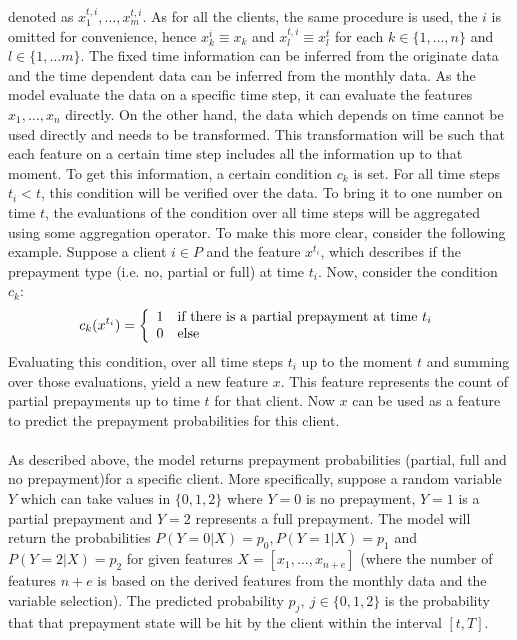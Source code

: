     denoted as  $x_1^{t, i}, \ldots, x_m^{t, i}$. As for all the clients, 
    the same procedure 
    is used, the $i$ is omitted for convenience, hence 
    $x_k^i \equiv x_k$ and $x_l^{t, i} \equiv x_l^t$ for each 
    $k \in \{1, \ldots, n\}$ and $l \in \{1, 
    \ldots m \}$.  The fixed time information can be inferred
    from the originate data and the time dependent data can be 
    inferred from the monthly data. As the model evaluate the data on 
    a specific time step, it can evaluate the features 
    $x_1, \ldots, x_n$ directly. On the other hand, the data
    which depends on time cannot be used directly and needs to be 
    transformed. This transformation will be such that each feature 
    on a certain time step includes all the information up to that 
    moment. To get this information, a certain condition $c_k$ is set. 
    For all time steps $t_i < t$, this condition will be verified 
    over the data. To bring it to one number on time $t$, the 
    evaluations of the condition over all time steps will be aggregated 
    using some aggregation operator. To make this more clear, consider 
    the following example. Suppose a client $i \in P$ and the feature 
    $x^{t_i}$, which describes if the prepayment type (i.e. no, partial or 
    full) at time $t_i$. Now, consider the condition $c_k$:
    \begin{equation}
        c_k(x^{t_i}) = \left\{
        \begin{array}{l l l l l}
            1 & \text{if there is a partial prepayment at time } t_i \\ 
            0 & \text{else}
        \end{array}
        \right.
    \end{equation}
    Evaluating this condition, over all time steps $t_i$ up to the moment 
    $t$ and summing over those evaluations, yield a new feature $x$. 
    This feature represents the count of partial prepayments up to time 
    $t$ for that client. Now $x$ can be used as a feature to predict 
    the prepayment probabilities for this client. 
    \\\\
    As described above, the model returns prepayment probabilities 
    (partial, full and no prepayment)for a specific client. More 
    specifically, suppose a random variable $Y$ which can take values in 
    $\{0, 1, 2\}$ where $Y=0$ is no prepayment, 
    $Y=1$ is a partial prepayment and $Y=2$ represents a full prepayment. 
    The model will return the probabilities 
    $P(Y = 0 | X) = p_0, P(Y = 1 | X) = p_1$ and 
    $P(Y = 2 | X) = p_2$
    for given features $X = [x_1, \ldots, x_{n+e}]$ (where the number of 
    features 
    $n+e$ is based on the derived features from the monthly data and 
    the variable selection). The predicted probability 
    $p_j, \ j \in \{0, 1, 2\}$ is the probability 
    that that prepayment state will be hit by the client within the 
    interval $[t, T]$. 

